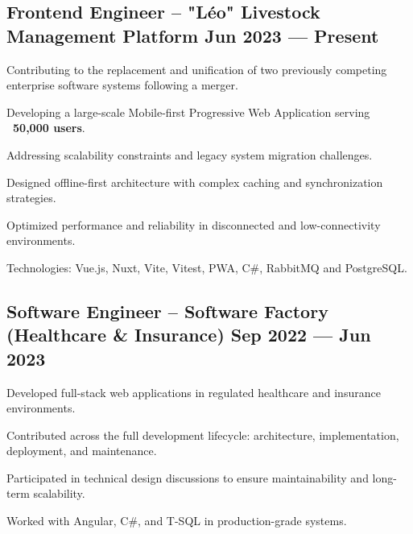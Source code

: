 \subsection{{Frontend Engineer – "Léo" Livestock Management Platform \hfill Jun 2023 --- Present}}
\begin{zitemize}
    \item Contributing to the replacement and unification of two previously competing enterprise software systems following a merger.
    \item Developing a large-scale Mobile-first Progressive Web Application serving \textbf{~50,000 users}.
    \item Addressing scalability constraints and legacy system migration challenges.
    \item Designed offline-first architecture with complex caching and synchronization strategies.
    \item Optimized performance and reliability in disconnected and low-connectivity environments.
    \item Technologies: Vue.js, Nuxt, Vite, Vitest, PWA, C\#, RabbitMQ and PostgreSQL.
\end{zitemize}

\subsection{{Software Engineer – Software Factory (Healthcare \& Insurance) \hfill Sep 2022 --- Jun 2023}}
\begin{zitemize}
    \item Developed full-stack web applications in regulated healthcare and insurance environments.
    \item Contributed across the full development lifecycle: architecture, implementation, deployment, and maintenance.
    \item Participated in technical design discussions to ensure maintainability and long-term scalability.
    \item Worked with Angular, C\#, and T-SQL in production-grade systems.
\end{zitemize}

